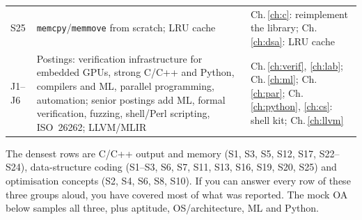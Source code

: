 \documentclass[10pt,a4paper,openany,oneside]{report}
\begin{document}
\begin{center}
\begin{xltabular}{\textwidth}{@{}L{1.2cm}Y L{5.1cm}@{}}
S25 & \texttt{memcpy}/\texttt{memmove} from scratch; LRU cache & Ch.\,\ref{ch:c}: reimplement the library; Ch.\,\ref{ch:dsa}: LRU cache\\
J1--J6 & Postings: verification infrastructure for embedded GPUs, strong C/C++ and Python, compilers and ML, parallel programming, automation; senior postings add ML, formal verification, fuzzing, shell/Perl scripting, ISO~26262; LLVM/MLIR & Ch.\,\ref{ch:verif}, \ref{ch:lab}; Ch.\,\ref{ch:ml}; Ch.\,\ref{ch:par}; Ch.\,\ref{ch:python}, \ref{ch:cs}: shell kit; Ch.\,\ref{ch:llvm}\\
\bottomrule
\end{xltabular}
\end{center}

\begin{mustbox}
The densest rows are C/C++ output and memory (S1, S3, S5, S12, S17, S22--S24), data-structure coding (S1--S3, S6, S7, S11, S13, S16, S19, S20, S25) and optimisation concepts (S2, S4, S6, S8, S10). If you can answer every row of these three groups aloud, you have covered most of what was reported. The mock OA below samples all three, plus aptitude, OS/architecture, ML and Python.
\end{mustbox}


\end{document}
